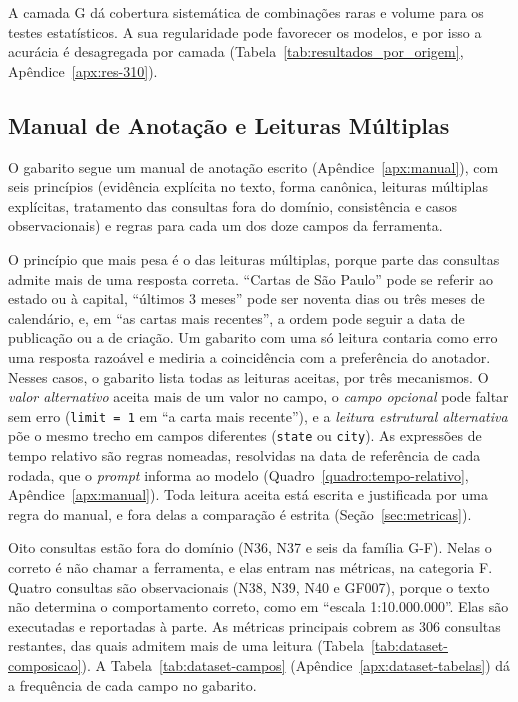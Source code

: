 

A camada G dá cobertura sistemática de combinações raras e volume para os testes estatísticos. A sua regularidade pode favorecer os modelos, e por isso a acurácia é desagregada por camada (Tabela~\ref{tab:resultados_por_origem}, Apêndice~\ref{apx:res-310}).

\subsection{Manual de Anotação e Leituras Múltiplas}
\label{sec:manual-anotacao}

O gabarito segue um manual de anotação escrito (Apêndice~\ref{apx:manual}), com seis princípios (evidência explícita no texto, forma canônica, leituras múltiplas explícitas, tratamento das consultas fora do domínio, consistência e casos observacionais) e regras para cada um dos doze campos da ferramenta.

O princípio que mais pesa é o das leituras múltiplas, porque parte das consultas admite mais de uma resposta correta. ``Cartas de São Paulo'' pode se referir ao estado ou à capital, ``últimos 3 meses'' pode ser noventa dias ou três meses de calendário, e, em ``as cartas mais recentes'', a ordem pode seguir a data de publicação ou a de criação. Um gabarito com uma só leitura contaria como erro uma resposta razoável e mediria a coincidência com a preferência do anotador. Nesses casos, o gabarito lista todas as leituras aceitas, por três mecanismos. O \emph{valor alternativo} aceita mais de um valor no campo, o \emph{campo opcional} pode faltar sem erro (\texttt{limit = 1} em ``a carta mais recente''), e a \emph{leitura estrutural alternativa} põe o mesmo trecho em campos diferentes (\texttt{state} ou \texttt{city}). As expressões de tempo relativo são regras nomeadas, resolvidas na data de referência de cada rodada, que o \textit{prompt} informa ao modelo (Quadro~\ref{quadro:tempo-relativo}, Apêndice~\ref{apx:manual}). Toda leitura aceita está escrita e justificada por uma regra do manual, e fora delas a comparação é estrita (Seção~\ref{sec:metricas}).

Oito consultas estão fora do domínio (N36, N37 e seis da família G-F). Nelas o correto é não chamar a ferramenta, e elas entram nas métricas, na categoria F. Quatro consultas são observacionais (N38, N39, N40 e GF007), porque o texto não determina o comportamento correto, como em ``escala 1:10.000.000''. Elas são executadas e reportadas à parte. As métricas principais cobrem as 306 consultas restantes, das quais  admitem mais de uma leitura (Tabela~\ref{tab:dataset-composicao}). A Tabela~\ref{tab:dataset-campos} (Apêndice~\ref{apx:dataset-tabelas}) dá a frequência de cada campo no gabarito.

